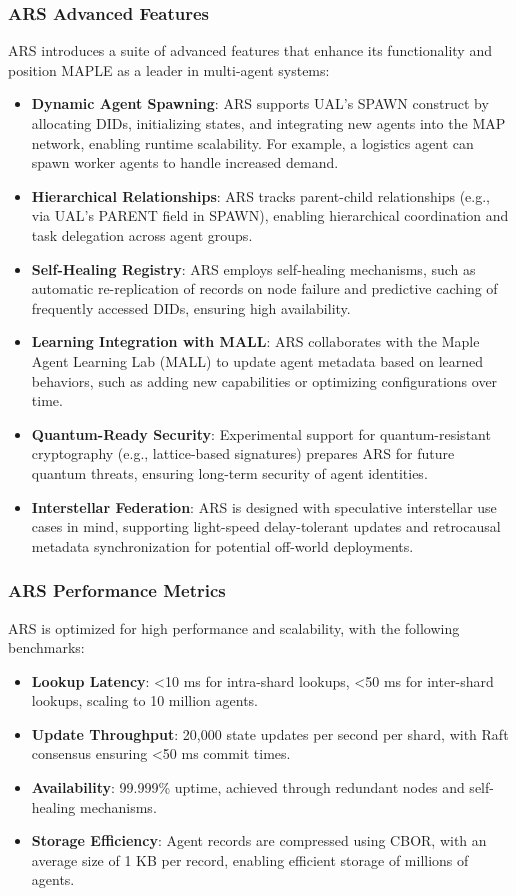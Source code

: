 \documentclass[a4paper,11pt]{article}
\begin{document}
\subsubsection{ARS Advanced Features}
ARS introduces a suite of advanced features that enhance its functionality and position MAPLE as a leader in multi-agent systems:
\begin{itemize}[leftmargin=*]
    \item \textbf{Dynamic Agent Spawning}: ARS supports UAL’s SPAWN construct by allocating DIDs, initializing states, and integrating new agents into the MAP network, enabling runtime scalability. For example, a logistics agent can spawn worker agents to handle increased demand.
    \item \textbf{Hierarchical Relationships}: ARS tracks parent-child relationships (e.g., via UAL’s PARENT field in SPAWN), enabling hierarchical coordination and task delegation across agent groups.
    \item \textbf{Self-Healing Registry}: ARS employs self-healing mechanisms, such as automatic re-replication of records on node failure and predictive caching of frequently accessed DIDs, ensuring high availability.
    \item \textbf{Learning Integration with MALL}: ARS collaborates with the Maple Agent Learning Lab (MALL) to update agent metadata based on learned behaviors, such as adding new capabilities or optimizing configurations over time.
    \item \textbf{Quantum-Ready Security}: Experimental support for quantum-resistant cryptography (e.g., lattice-based signatures) prepares ARS for future quantum threats, ensuring long-term security of agent identities.
    \item \textbf{Interstellar Federation}: ARS is designed with speculative interstellar use cases in mind, supporting light-speed delay-tolerant updates and retrocausal metadata synchronization for potential off-world deployments.
\end{itemize}

\subsubsection{ARS Performance Metrics}
ARS is optimized for high performance and scalability, with the following benchmarks:
\begin{itemize}[leftmargin=*]
    \item \textbf{Lookup Latency}: <10 ms for intra-shard lookups, <50 ms for inter-shard lookups, scaling to 10 million agents.
    \item \textbf{Update Throughput}: 20,000 state updates per second per shard, with Raft consensus ensuring <50 ms commit times.
    \item \textbf{Availability}: 99.999\% uptime, achieved through redundant nodes and self-healing mechanisms.
    \item \textbf{Storage Efficiency}: Agent records are compressed using CBOR, with an average size of 1 KB per record, enabling efficient storage of millions of agents.
\end{itemize}
\end{document}

